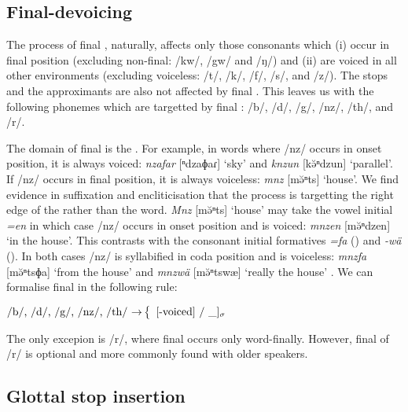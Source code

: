 \subsection{Final-devoicing} \label{final-devoicing-section}

The process of final , naturally, affects only those consonants which (i) occur in final position (excluding non-final: /kw/, /gw/ and /ŋ/) and (ii) are voiced in all other environments (excluding voiceless: /t/, /k/, /f/, /s/, and /z/). The  stops and the approximants are also not affected by final . This leaves us with the following phonemes which are targetted by final : /b/, /d/, /g/, /nz/, /th/, and /r/.%

The domain of final  is the . For example, in words where /nz/ occurs in onset position, it is always voiced: \emph{nzafar} [ⁿdzaɸaɾ] `sky' and \emph{knzun} [kə̆ⁿdzun] `parallel'. If /nz/ occurs in final position, it is always voiceless: \emph{mnz} [mə̆ⁿts] `house'. We find evidence in suffixation and encliticisation that the process is targetting the right edge of the  rather than the word. \emph{Mnz} [mə̆ⁿts] `house' may take the vowel initial   \emph{=en} in which case /nz/ occurs in onset position and is voiced: \emph{mnzen} [mə̆ⁿdzen] `in the house'. This contrasts with the consonant initial formatives \emph{=fa} (\Abl) and \emph{-wä} (\Emph). In both cases /nz/ is syllabified in coda position and is voiceless: \emph{mnzfa} [mə̆ⁿtsɸa] `from the house' and \emph{mnzwä} [mə̆ⁿtswæ] `really the house' . We can formalise final  in the following rule:

\ea
\centering
$\mbox{/b/, /d/, /g/, /nz/, /th/ $\rightarrow$} \left\{
\begin{array}{l}
  \parbox{3,75cm}{[-voiced] / \_]\textsubscript{$\sigma$}} \\
\end{array}
\right.$
\z

The only excepion is /r/, where final  occurs only word-finally. However, final  of /r/ is optional and more commonly found with older speakers.

\subsection{Glottal stop insertion} \label{glottal-stop-insertion-section}


